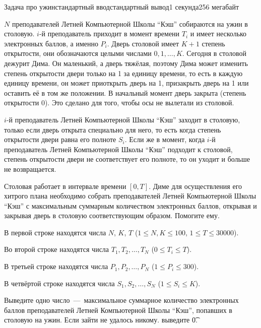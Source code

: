 \begin{problem}{Задача про ужин}{стандартный ввод}{стандартный вывод}{1 секунда}{256 мегабайт}

$N$ преподавателей Летней Компьютерной Школы ``Кэш'' собираются на ужин в столовую. $i$-й преподаватель приходит в момент времени $T_i$ и имеет несколько электронных баллов, а именно $P_i$. Дверь столовой имеет $K + 1$ степень открытости, они обозначаются целыми числами $0, 1, \ldots, K$. Сегодня в столовой дежурит Дима. Он маленький, а дверь тяжёлая, поэтому Дима может изменить степень открытости двери только на 1 за единицу времени, то есть в каждую единицу времени, он может приоткрыть дверь на 1, призакрыть дверь на 1 или оставить её в том же положении. В начальный момент дверь закрыта (степень открытости 0). Это сделано для того, чтобы осы не вылетали из столовой.

$i$-й преподаватель Летней Компьютерной Школы ``Кэш'' заходит в столовую, только если дверь открыта специально для него, то есть когда степень открытости двери равна его полноте $S_i$. Если же в момент, когда $i$-й преподаватель Летней Компьютерной Школы ``Кэш'' подходит к столовой, степень открытости двери не соответствует его полноте, то он уходит и больше не возвращается.

Столовая работает в интервале времени $\left[{}0, T\right]$. Диме для осуществления его хитрого плана необходимо собрать преподавателей Летней Компьютерной Школы ``Кэш'' с максимальным суммарным количеством электронных баллов, открывая и закрывая дверь в столовую соответствующим образом. Помогите ему.

\InputFile
В первой строке находятся числа $N$, $K$, $T$ ($1 \le N, K \le 100$, $1 \le T \le 30000$).

Во второй строке находятся числа $T_1, T_2, \ldots, T_N$ ($0 \le T_i \le T$).

В третьей строке находятся числа $P_1, P_2, \ldots, P_N$ ($1 \le P_i \le 300$).

В четвёртой строке находятся числа $S_1, S_2, \ldots, S_N$ ($1 \le S_i \le K$).

\OutputFile
Выведите одно число~---~максимальное суммарное количество электронных баллов преподавателей Летней Компьютерной Школы ``Кэш'', попавших в столовую на ужин. Если зайти не удалось никому. выведите \t{0}.

\Examples

\begin{example}
%
%
\end{example}

\end{problem}

